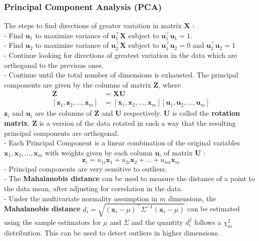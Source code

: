 \documentclass[11pt,a4paper]{article}
\begin{document}
\subsubsection{ Principal Component Analysis (PCA)}
The steps to find directions of greater variation in matrix $\mathbf{X}$ :\\
- Find $\mathbf{u}_{1}$ to maximize variance of $\mathbf{u}_{1}^{\top} \mathbf{X}$ subject to $\mathbf{u}_{1}^{\top} \mathbf{u}_{1}=1$.\\
- Find $\mathbf{u}_{2}$ to maximize variance of $\mathbf{u}_{2}^{\top} \mathbf{X}$ subject to $\mathbf{u}_{1}^{\top} \mathbf{u}_{2}=0$ and $\mathbf{u}_{2}^{\top} \mathbf{u}_{2}=1$\\
- Continue looking for directions of greatest variation in the data which are orthogonal to the previous ones.\\
- Continue until the total number of dimensions is exhausted.
The principal components are given by the columns of matrix $\mathbf{Z}$, where
\begin{equation}
    \begin{aligned}
        \mathbf{Z}&=\mathbf{X U}\\
[\mathbf{z}_1,\mathbf{z}_2,...,\mathbf{z}_m]&=[\mathbf{x}_1,\mathbf{x}_2,...,\mathbf{x}_m][\mathbf{u}_1,\mathbf{u}_2,...,\mathbf{u}_m]
    \end{aligned}
    \nonumber
\end{equation}
$\mathbf{z}_{i}$ and $\mathbf{u}_{i}$ are the columns of $\mathbf{Z}$ and $\mathbf{U}$ respectively. $\mathbf{U}$ is called the \textbf{rotation matrix}. $\mathbf{Z}$ is a version of the data rotated in such a way that the resulting principal components are orthogonal.\\
- Each Principal Component is a linear combination of the original variables $\mathbf{x}_{1}, \mathbf{x}_{2}, \ldots, \mathbf{x}_{m}$ with weights given by each column $\mathbf{u}_{i}$ of matrix $\mathbf{U}$ :
$$
\mathbf{z}_{i}=u_{1 i} \mathbf{x}_{1}+u_{2 i} \mathbf{x}_{2}+\ldots+u_{m i} \mathbf{x}_{m}
$$
- Principal components are very sensitive to outliers.\\
- The \textbf{Mahalanobis distance} can be used to measure the distance of a point to the data mean, after adjusting for correlation in the data.\\
- Under the multivariate normality assumption in $m$ dimensions, the \textbf{Mahalanobis distance} $d_{i}=\sqrt{\left(\mathbf{x}_{i}-\mu\right)^{\top} \Sigma^{-1}\left(\mathbf{x}_{i}-\mu\right)}$ can be estimated using the sample estimators for $\mu$ and $\Sigma$ and the quantity $d_{i}^{2}$ follows a $\chi_{m}^{2}$ distribution. This can be used to detect outliers in higher dimensions.\\
\end{document}

